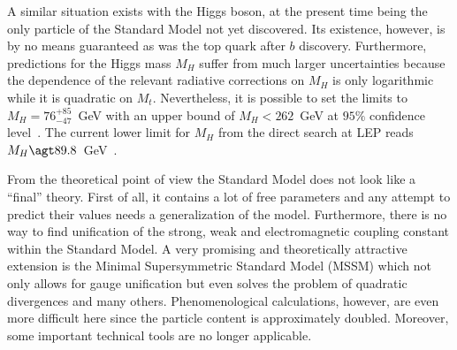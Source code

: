 A similar situation exists with the Higgs boson, at the present time
being the only particle of the Standard Model not yet discovered. Its
existence, however, is by no means guaranteed as was the top quark after
$b$ discovery.  Furthermore, predictions for the Higgs mass $M_H$ suffer
from much larger uncertainties because the dependence of the relevant
radiative corrections on $M_H$ is only logarithmic~\cite{Vel77} while it
is quadratic on $M_t$.  Nevertheless, it is possible to set the limits
to $M_H=76^{+85}_{-47}$~GeV with an upper bound of $M_H< 262$~GeV at
$95\%$ confidence level~\cite{Teu98}.  The current lower limit for $M_H$
from the direct search at LEP reads $M_H\agt 89.8$~GeV~\cite{Mh_LEP}.

From the theoretical point of view the Standard Model does not look like
a ``final'' theory. First of all, it contains a lot of free parameters
and any attempt to predict their values needs a generalization of the
model.  Furthermore, there is no way to find unification of the strong,
weak and electromagnetic coupling constant within the Standard Model.  A
very promising and theoretically attractive extension is the Minimal
Supersymmetric Standard Model (MSSM) which not only allows for gauge
unification but even solves the problem of quadratic divergences and
many others. Phenomenological calculations, however, are even more
difficult here since the particle content is approximately doubled.
Moreover, some important technical tools are no longer applicable.

